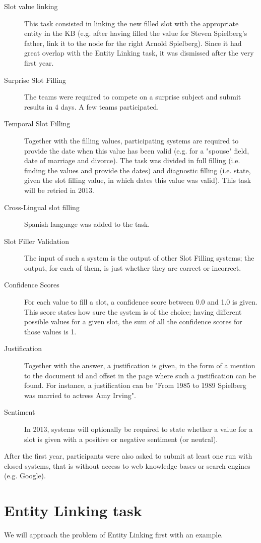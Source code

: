 \documentclass[a4paper,11pt]{report}
\begin{document}
\begin{description}
\item[Slot value linking] This task consisted in linking the new filled slot with the appropriate entity in the KB (e.g. after having filled the value for Steven Spielberg's father, link it to the node for the right Arnold Spielberg). Since it had great overlap with the Entity Linking task, it was dismissed after the very first year.
\item[Surprise Slot Filling] The teams were required to compete on a surprise subject and submit results in 4 days. A few teams participated.
\item[Temporal Slot Filling] Together with the filling values, participating systems are required to provide the date when this value has been valid (e.g. for a "spouse" field, date of marriage and divorce). The task was divided in full filling (i.e. finding the values and provide the dates) and diagnostic filling (i.e. state, given the slot filling value, in which dates this value was valid). This task will be retried in 2013.
\item[Cross-Lingual slot filling] Spanish language was added to the task.
\item[Slot Filler Validation] The input of such a system is the output of other Slot Filling systems; the output, for each of them, is just whether they are correct or incorrect.
\item[Confidence Scores] For each value to fill a slot, a confidence score between 0.0 and 1.0 is given. This score states how sure the system is of the choice; having different possible values for a given slot, the sum of all the confidence scores for those values is 1.
\item[Justification] Together with the answer, a justification is given, in the form of a mention to the document id and offset in the page where such a justification can be found. For instance, a justification can be "From 1985 to 1989 Spielberg was married to actress Amy Irving".
\item[Sentiment] In 2013, systems will optionally be required to state whether a value for a slot is given with a positive or negative sentiment (or neutral).
\end{description}

After the first year, participants were also asked to submit at least one run with closed systems, that is without access to web knowledge bases or search engines (e.g. Google).

\section{Entity Linking task}
We will approach the problem of Entity Linking first with an example.
\end{document}
